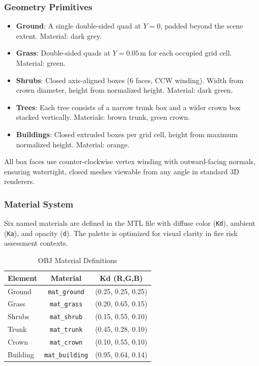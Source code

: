 \subsubsection{Geometry Primitives}
\begin{itemize}
    \item \textbf{Ground}: A single double-sided quad at $Y=0$, padded beyond the scene extent. Material: dark grey.
    \item \textbf{Grass}: Double-sided quads at $Y=0.05$\,m for each occupied grid cell. Material: green.
    \item \textbf{Shrubs}: Closed axis-aligned boxes (6 faces, CCW winding). Width from crown diameter, height from normalized height. Material: dark green.
    \item \textbf{Trees}: Each tree consists of a narrow trunk box and a wider crown box stacked vertically. Materials: brown trunk, green crown.
    \item \textbf{Buildings}: Closed extruded boxes per grid cell, height from maximum normalized height. Material: orange.
\end{itemize}

All box faces use counter-clockwise vertex winding with outward-facing normals, ensuring watertight, closed meshes viewable from any angle in standard 3D renderers.

\subsubsection{Material System}
Six named materials are defined in the MTL file with diffuse color (\texttt{Kd}), ambient (\texttt{Ka}), and opacity (\texttt{d}). The palette is optimized for visual clarity in fire risk assessment contexts.

\begin{table}[h]
\centering
\caption{OBJ Material Definitions}
\label{tab:materials}
\begin{tabular}{lcc}
\hline
\textbf{Element} & \textbf{Material} & \textbf{Kd (R,G,B)} \\
\hline
Ground   & \texttt{mat\_ground}   & (0.25, 0.25, 0.25) \\
Grass    & \texttt{mat\_grass}    & (0.20, 0.65, 0.15) \\
Shrubs   & \texttt{mat\_shrub}    & (0.15, 0.55, 0.10) \\
Trunk    & \texttt{mat\_trunk}    & (0.45, 0.28, 0.10) \\
Crown    & \texttt{mat\_crown}    & (0.10, 0.55, 0.10) \\
Building & \texttt{mat\_building} & (0.95, 0.64, 0.14) \\
\hline
\end{tabular}
\end{table}
